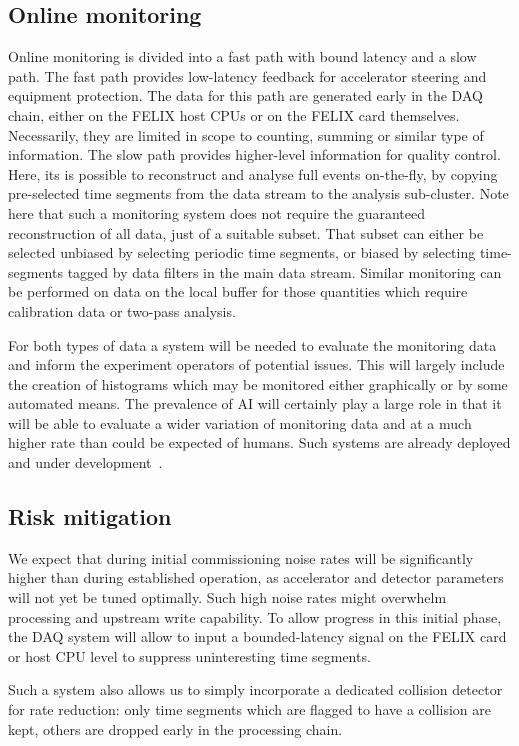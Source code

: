 \subsection{Online monitoring}\label{subsec:online_mon}
Online monitoring is divided into a fast path with bound latency and a slow path. The fast path provides low-latency feedback for accelerator steering and equipment protection. The data for this path are generated early in the DAQ chain, either on the FELIX host CPUs or on the FELIX card themselves. Necessarily, they are limited in scope to counting, summing or similar type of information. The slow path provides higher-level information for quality control. Here, its is possible to reconstruct and analyse full events on-the-fly, by copying pre-selected time segments from the data stream to the analysis sub-cluster. Note here that such a monitoring system does not require the guaranteed reconstruction of all data, just of a suitable subset. That subset can either be selected unbiased by selecting periodic time segments, or biased by selecting time-segments tagged by data filters in the main data stream.  Similar monitoring can be performed on data on the local buffer for those quantities which require calibration data or two-pass analysis.

For both types of data a system will be needed to evaluate the monitoring data and inform the experiment operators of potential issues. This will largely include the creation of histograms which may be monitored either graphically or by some automated means. The prevalence of AI will certainly play a large role in that it will be able to evaluate a wider variation of monitoring data and at a much higher rate than could be expected of humans. Such systems are already deployed and under development~\cite{Hydra2021}. 

\subsection{Risk mitigation}
We expect that during initial commissioning noise rates will be significantly higher than during established operation, as accelerator and detector parameters will not yet be tuned optimally. Such high noise rates might overwhelm processing and upstream write capability. To allow progress in this initial phase, the DAQ system will allow to input a bounded-latency signal on the FELIX card or host CPU level to suppress uninteresting time segments.

Such a system also allows us to simply incorporate a dedicated collision detector for rate reduction: only time segments which are flagged to have a collision are kept, others are dropped early in the processing chain. 


